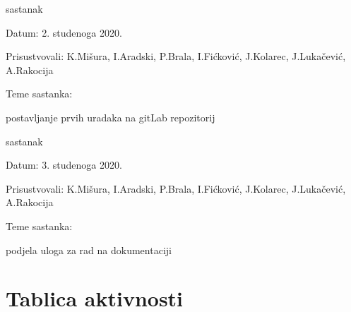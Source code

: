 \begin{packed_enum}
			\item  sastanak
			\item[] \begin{packed_item}
				\item Datum: 2. studenoga 2020.
				\item Prisustvovali:  K.Mišura, I.Aradski, P.Brala, I.Fićković, J.Kolarec, J.Lukačević, A.Rakocija
				\item Teme sastanka:
				\begin{packed_item}
					\item  postavljanje prvih uradaka na gitLab repozitorij 
				\end{packed_item}
			\end{packed_item}
			
			\item  sastanak
			\item[] \begin{packed_item}
				\item Datum: 3. studenoga 2020.
				\item Prisustvovali:  K.Mišura, I.Aradski, P.Brala, I.Fićković, J.Kolarec, J.Lukačević, A.Rakocija
				\item Teme sastanka:
				\begin{packed_item}
					\item  podjela uloga za rad na dokumentaciji 
				\end{packed_item}
			\end{packed_item}
			
		\end{packed_enum}
		
		\eject
		\section*{Tablica aktivnosti}
		
			
					
						
			
